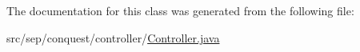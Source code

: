 The documentation for this class was generated from the following file:\begin{DoxyCompactItemize}
\item 
src/sep/conquest/controller/\hyperlink{_controller_8java}{Controller.java}\end{DoxyCompactItemize}
